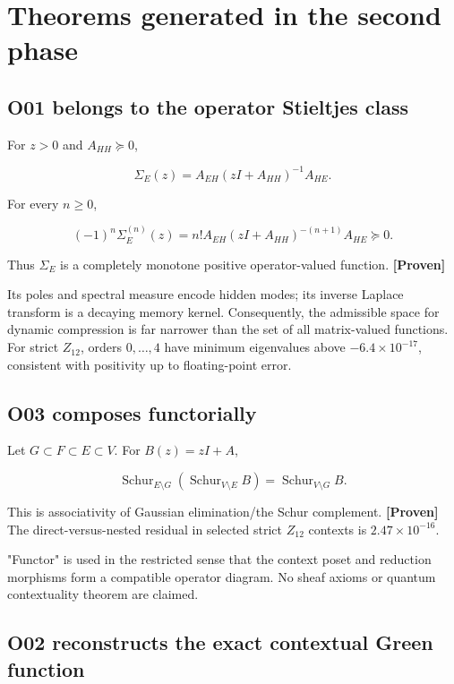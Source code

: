 \documentclass[11pt,a4paper,openany]{report}
\newcommand{\statusProven}{\textcolor{fingreen}{[Proven]}}
\begin{document}
\chapter{Theorems generated in the second phase}

\section{O01 belongs to the operator Stieltjes class}

For \(z>0\) and \(A_{HH}\succeq0\),

\[
\Sigma_E(z)=A_{EH}(zI+A_{HH})^{-1}A_{HE}.
\]

For every \(n\geq0\),

\[
(-1)^n\Sigma_E^{(n)}(z)
=n!A_{EH}(zI+A_{HH})^{-(n+1)}A_{HE}\succeq0.
\]

Thus \(\Sigma_E\) is a completely monotone positive operator-valued function. \textbf{\statusProven{}}

Its poles and spectral measure encode hidden modes; its inverse Laplace transform is a decaying memory kernel. Consequently, the admissible space for dynamic compression is far narrower than the set of all matrix-valued functions. For strict \(Z_{12}\), orders \(0,\ldots,4\) have minimum eigenvalues above \(-6.4\times10^{-17}\), consistent with positivity up to floating-point error.

\section{O03 composes functorially}

Let \(G\subset F\subset E\subset V\). For \(B(z)=zI+A\),

\[
\operatorname{Schur}_{E\setminus G}
\left(\operatorname{Schur}_{V\setminus E}B\right)
=\operatorname{Schur}_{V\setminus G}B.
\]

This is associativity of Gaussian elimination/\allowbreak{}the Schur complement. \textbf{\statusProven{}} The direct-versus-nested residual in selected strict \(Z_{12}\) contexts is \(2.47\times10^{-16}\).

"Functor" is used in the restricted sense that the context poset and reduction morphisms form a compatible operator diagram. No sheaf axioms or quantum contextuality theorem are claimed.

\section{O02 reconstructs the exact contextual Green function}
\end{document}
